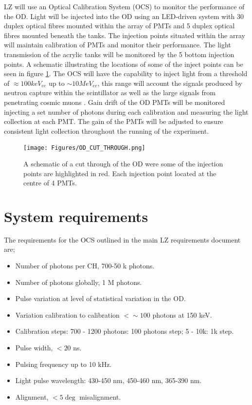 LZ will use an Optical Calibration System (OCS) to monitor the performance of the OD. Light will be injected into the OD using an LED-driven system with 30 duplex optical fibres mounted within the array of PMTs and 5 duplex optical fibres mounted beneath the tanks. The injection points situated within the array will maintain calibration of PMTs and monitor their performance. The light transmission of the acrylic tanks will be monitored by the 5 bottom injection points. A schematic illustrating the locations of some of the inject points can be seen in figure \ref{fig:inject}. The OCS will have the capability to inject light from a threshold of $\approx 100 keV_{ee}$ up to $\sim 10 MeV_{ee}$, this range will account the signals produced by neutron capture within the scintillator as well as the large signals from penetrating cosmic muons \cite{LZTDR}. Gain drift of the OD PMTs will be monitored injecting a set number of photons during each calibration and measuring the light collection at each PMT. The gain of the PMTs will be adjusted to ensure consistent light collection throughout the running of the experiment.

\begin{figure}[h!]
    \centering
    \texttt{[image: Figures/OD\_CUT\_THROUGH.png]}
    \caption{A schematic of a cut through of the OD were some of the injection points are highlighted in red. Each injection point located at the centre of 4 PMTs.}
    \label{fig:inject}
\end{figure}

\section{System requirements}\label{list:SystemReq}
The requirements for the OCS outlined in the main LZ requirements document are;
\begin{itemize}
    \item Number of photons per CH, 700-50 k photons.
    \item Number of photons globally, 1 M photons.
    \item Pulse variation at level of statistical variation in the OD.
    \item Variation calibration to calibration $< \sim100$ photons at 150 keV.
    \item Calibration steps: 700 - 1200 photons: 100 photons step; 5 - 10k: 1k step.
    \item Pulse width, $< 20$ ns.
    \item Pulsing frequency up to 10 kHz.
    \item Light pulse wavelength: 430-450 nm, 450-460 nm, 365-390 nm.
    \item Alignment, $<5\deg$ misalignment.
\end{itemize}

